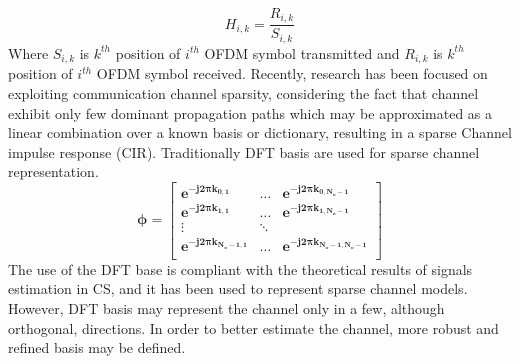 \begin{equation}
H_{i,k}=\dfrac{R_{i,k}}{S_{i,k}}
\end{equation}
Where $S_{i,k}$ is $k^{th}$ position of $i^{th}$ OFDM symbol transmitted and  $R_{i,k}$ is $k^{th}$ position of $i^{th}$ OFDM symbol received.
 Recently, research has been focused on exploiting communication channel sparsity, considering the fact that channel exhibit only few dominant propagation paths which may be approximated as a linear combination over a known basis or dictionary, resulting in a sparse Channel impulse response (CIR). Traditionally DFT basis are used for sparse channel representation. 
	\[
 \mathbf{	\phi=
	\begin{bmatrix}
e^{-j2\pi k_{0,1}} &\dots& e^{-j2\pi k_{0,N_o-1}} \\
e^{-j2\pi k_{1,1}} &\dots& e^{-j2\pi k_{1,N_o-1}} \\
\vdots & \ddots & \\                                                                                     
e^{-j2\pi k_{N_o-1,1}}  &\dots& e^{-j2\pi k_{N_o-1,N_o-1}} \\
	\end{bmatrix}}
	\]	
The use of the DFT base is compliant with the theoretical results of signals estimation in CS\cite{Candes08}, and it has been used to represent sparse channel models. However, DFT basis may represent the channel only in a few, although orthogonal, directions. In order to better estimate the channel, more robust and refined basis may be defined.\\
